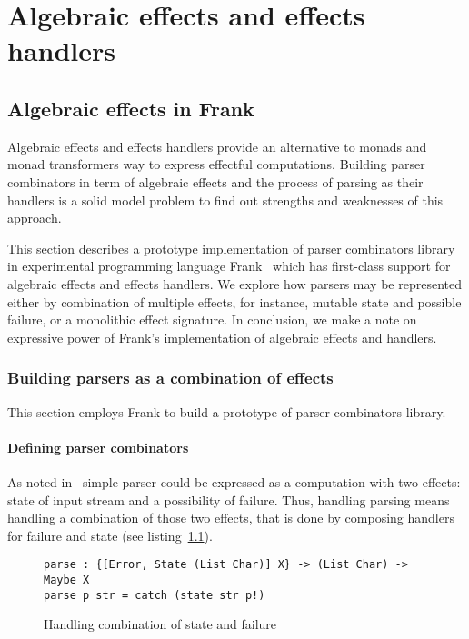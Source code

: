 \chapter{Algebraic effects and effects handlers}
\label{cpt-alg-eff}

  \section{Algebraic effects in Frank}
  \label{cpt-alg-eff:frank}

  Algebraic effects and effects handlers provide an alternative to monads and monad
  transformers way to express effectful computations. Building parser combinators in
  term of algebraic effects and the process of parsing as their handlers is a solid
  model problem to find out strengths and weaknesses of this approach.

  This section describes a prototype implementation of parser
  combinators library in experimental programming language
  Frank~\cite{DBLP:conf/popl/LindleyMM17} which has first-class support for
  algebraic effects and effects handlers. We explore how parsers may be represented either by
  combination of multiple effects, for instance, mutable state and possible failure,
  or a monolithic effect signature. In conclusion, we make a
  note on expressive power of Frank's implementation of algebraic effects and
  handlers.

  \subsection{Building parsers as a combination of effects}

    This section employs Frank to build a prototype of parser
    combinators library.

    \subsubsection{Defining parser combinators}

    As noted in~\cite{monParsing} simple parser could be expressed as a computation
    with two effects: state of input stream and a possibility of failure. Thus,
    handling parsing means handling a combination of those two effects, that is done
    by composing handlers for failure and state (see
    listing~\ref{listing:parserHandlerCombo}).

    \begin{figure}[h]
    \begin{lstlisting}
parse : {[Error, State (List Char)] X} -> (List Char) -> Maybe X
parse p str = catch (state str p!)
    \end{lstlisting}
    \caption{Handling combination of state and failure}
    \label{listing:parserHandlerCombo}
    \end{figure}

